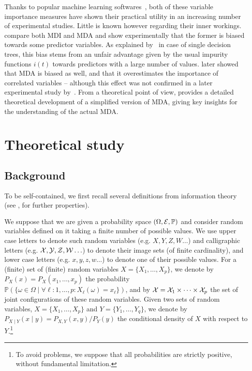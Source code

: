 Thanks to popular machine learning
softwares~\citep{breiman:2002,liaw:2002,pedregosa:2011},
both of these variable importance measures have shown their practical utility in
an increasing number of experimental studies. Little is known however regarding
their inner workings. \cite{strobl:2007b} compare both MDI and MDA and show
experimentally that the former is biased towards some predictor variables. As
explained by~\cite{white:1994} in case of single decision trees, this
bias stems from an unfair advantage given by the usual impurity functions $i(t)$
towards predictors with a large number of values. \cite{strobl:2008}
later showed  that MDA is biased as well, and that it overestimates the
importance of correlated variables -- although this effect was not confirmed in
a later experimental study by~\cite{genuer:2010}.  From a theoretical
point of view, \cite{ishwaran:2007} provides a detailed theoretical
development of a simplified version of MDA, giving key insights for the
understanding of the actual MDA.

\section{Theoretical study}
\label{sec:6:theory}

\subsection{Background}

To be self-contained, we first recall several definitions from information
theory (see \citep{cover:2012}, for further properties).

We suppose that we are given a probability space $(\Omega, {\cal E},
\mathbb{P})$ and  consider random variables defined on it taking a finite
number of possible values. We use upper case letters to denote such random
variables (e.g. $X, Y, Z, W \ldots$)  and calligraphic letters (e.g. $\cal X,
Y, Z, W \ldots$) to denote their image sets (of finite cardinality), and lower
case letters (e.g. $x, y, z, w \ldots$) to denote one of their possible values.
For a (finite) set of (finite) random variables $ X = \{X_{1}, \ldots ,
X_{p}\}$, we denote by $P_{X}(x) = P_{X}(x_{1}, \ldots , x_{p})$ the
probability $\mathbb{P}(\{ \omega \in \Omega \mid  \forall \ell : 1, \ldots, p:
X_{\ell}(\omega) =x_{\ell}\})$, and by ${\cal X} = {\cal X}_{1} \times \cdots
\times {\cal X}_{p}$ the set of joint configurations of these random variables.
Given two sets of random variables, $X = \{X_{1}, \ldots , X_{p}\}$ and
$Y=\{Y_{1}, \ldots , Y_{q}\}$, we denote by $P_{X \mid Y}(x \mid y) = {P_{X, Y}
(x,  y)}/ {P_{Y}(y)}$ the conditional density of $X$ with respect to
$Y$.\footnote{To avoid problems, we suppose that all probabilities are strictly
positive, without fundamental limitation.}

